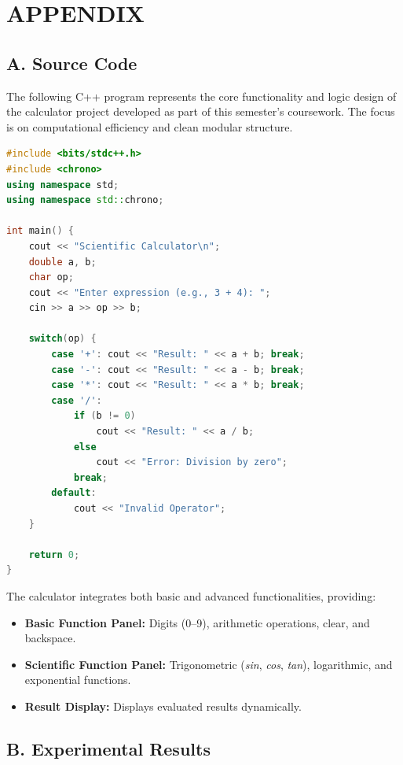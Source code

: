 \documentclass[a4paper,12pt,oneside]{report}
\numberwithin{equation}{chapter}
\numberwithin{figure}{chapter}
\numberwithin{table}{chapter}
\begin{document}
\chapter*{APPENDIX}

\section*{A. Source Code}

The following C++ program represents the core functionality and logic design of the calculator project developed as part of this semester’s coursework. The focus is on computational efficiency and clean modular structure.

\begin{lstlisting}[language=C++, caption={Main Calculator Code}]
#include <bits/stdc++.h>
#include <chrono>
using namespace std;
using namespace std::chrono;

int main() {
    cout << "Scientific Calculator\n";
    double a, b;
    char op;
    cout << "Enter expression (e.g., 3 + 4): ";
    cin >> a >> op >> b;

    switch(op) {
        case '+': cout << "Result: " << a + b; break;
        case '-': cout << "Result: " << a - b; break;
        case '*': cout << "Result: " << a * b; break;
        case '/':
            if (b != 0)
                cout << "Result: " << a / b;
            else
                cout << "Error: Division by zero";
            break;
        default:
            cout << "Invalid Operator";
    }

    return 0;
}
\end{lstlisting}

The calculator integrates both basic and advanced functionalities, providing:

\begin{itemize}
    \item \textbf{Basic Function Panel:} Digits (0--9), arithmetic operations, clear, and backspace.
    \item \textbf{Scientific Function Panel:} Trigonometric (\textit{sin}, \textit{cos}, \textit{tan}), logarithmic, and exponential functions.
    \item \textbf{Result Display:} Displays evaluated results dynamically.
\end{itemize}

\section*{B. Experimental Results}
\end{document}

